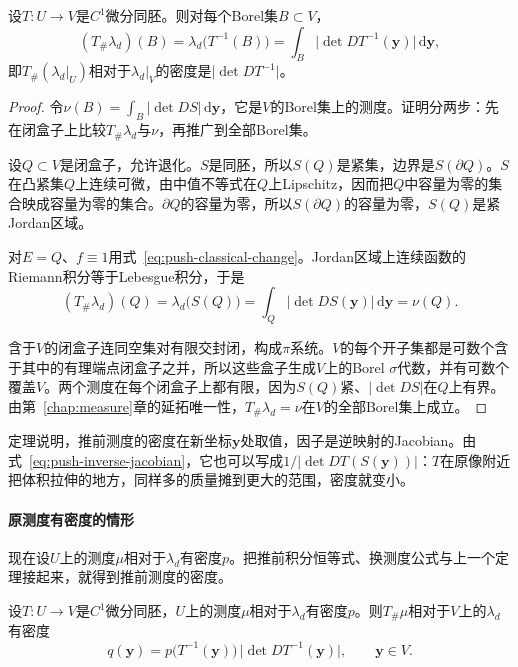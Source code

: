 \begin{theorem}[微分同胚下Lebesgue测度的推前]
\label{thm:push-lebesgue-diffeo}
设$T:U\to V$是$C^1$微分同胚。则对每个Borel集$B\subset V$，
\begin{equation}
(T_\#\lambda_d)(B)=\lambda_d\bigl(T^{-1}(B)\bigr)=\int_B\bigl\lvert\det DT^{-1}(\bm y)\bigr\rvert\,\mathrm d\bm y ,
\label{eq:push-lebesgue-diffeo}
\end{equation}
即$T_\#(\lambda_d|_U)$相对于$\lambda_d|_V$的密度是$\lvert\det DT^{-1}\rvert$。
\end{theorem}

\begin{proof}
令$\nu(B)=\int_B\lvert\det DS\rvert\,\mathrm d\bm y$，它是$V$的Borel集上的测度。证明分两步：先在闭盒子上比较$T_\#\lambda_d$与$\nu$，再推广到全部Borel集。

设$Q\subset V$是闭盒子，允许退化。$S$是同胚，所以$S(Q)$是紧集，边界是$S(\partial Q)$。$S$在凸紧集$Q$上连续可微，由中值不等式在$Q$上Lipschitz，因而把$Q$中容量为零的集合映成容量为零的集合。$\partial Q$的容量为零，所以$S(\partial Q)$的容量为零，$S(Q)$是紧Jordan区域。

对$E=Q$、$f\equiv1$用式~\eqref{eq:push-classical-change}。Jordan区域上连续函数的Riemann积分等于Lebesgue积分，于是
\[
(T_\#\lambda_d)(Q)=\lambda_d\bigl(S(Q)\bigr)=\int_Q\lvert\det DS(\bm y)\rvert\,\mathrm d\bm y=\nu(Q).
\]

含于$V$的闭盒子连同空集对有限交封闭，构成$\pi$系统。$V$的每个开子集都是可数个含于其中的有理端点闭盒子之并，所以这些盒子生成$V$上的Borel $\sigma$代数，并有可数个覆盖$V$。两个测度在每个闭盒子上都有限，因为$S(Q)$紧、$\lvert\det DS\rvert$在$Q$上有界。由第~\ref{chap:measure}章的延拓唯一性，$T_\#\lambda_d=\nu$在$V$的全部Borel集上成立。
\end{proof}

定理说明，推前测度的密度在新坐标$\bm y$处取值，因子是逆映射的Jacobian。由式~\eqref{eq:push-inverse-jacobian}，它也可以写成$1/\lvert\det DT(S(\bm y))\rvert$：$T$在原像附近把体积拉伸的地方，同样多的质量摊到更大的范围，密度就变小。

\paragraph{原测度有密度的情形}
现在设$U$上的测度$\mu$相对于$\lambda_d$有密度$p$。把推前积分恒等式、换测度公式与上一个定理接起来，就得到推前测度的密度。

\begin{theorem}[微分同胚下的推前密度]
\label{thm:push-density-diffeo}
设$T:U\to V$是$C^1$微分同胚，$U$上的测度$\mu$相对于$\lambda_d$有密度$p$。则$T_\#\mu$相对于$V$上的$\lambda_d$有密度
\begin{equation}
q(\bm y)=p\bigl(T^{-1}(\bm y)\bigr)\,\bigl\lvert\det DT^{-1}(\bm y)\bigr\rvert ,\qquad\bm y\in V .
\label{eq:push-density-diffeo}
\end{equation}
\end{theorem}

